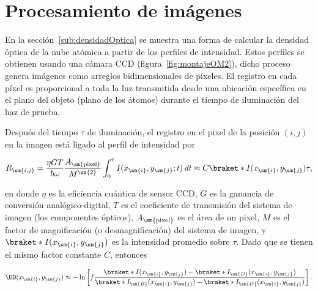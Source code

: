 \renewcommand*{\thepage}{\thechapter-\arabic{page}}
\pretocmd{\chapter}{
\clearpage
\setcounter{page}{1}
}{}{}

\makeatletter
\renewcommand*\l@section[2]{\@dottedtocline{1}{1.5em}{2.3em}{\hypersetup{linkcolor=black}#1}{#2\hskip 1.5em}}
\renewcommand{\@pnumwidth}{38.92712pt}
\makeatother

\cleardoublepage

\chapter{\label{ap:procesamientoImagenes}Procesamiento de imágenes}

En la sección~\ref{sub:densidadOptica} se muestra una forma de calcular la densidad óptica de la nube atómica a partir de los perfiles de intensidad. Estos perfiles se obtienen usando una cámara CCD (figura~\ref{fig:montajeOM2}), dicho proceso genera imágenes como arreglos bidimensionales de píxeles. El registro en cada píxel es proporcional a toda la luz transmitida desde una ubicación específica en el plano del objeto (plano de los átomos) durante el tiempo de iluminación del haz de prueba.

\p Después del tiempo $\tau$ de iluminación, el registro en el pixel de la posición $(i,j)$ en la imagen está ligado al perfil de intensidad por~\supercite{horikoshi}

\begin{equation}
\label{ec:registroPixel}
R_\sm{i,j}=\frac{\eta GT}{\hbar\omega}\frac{A_\sm{\mathrm{pixel}}}{M^\sm{2}}\int_{0}^{\tau}I(x_\sm{i},y_\sm{j};t)\:dt\approx C \braket*{I(x_\sm{i},y_\sm{j})}\tau,
\end{equation}

en donde $\eta$ es la eficiencia cuántica de sensor CCD, $G$ es la ganancia de conversión analógico-digital, $T$ es el coeficiente de transmisión del sistema de imagen (los componentes ópticos), $A_\sm{\mathrm{pixel}}$ es el área de un pixel, $M$ es el factor de magnificación (o desmagnificación) del sistema de imagen, y $\braket*{I(x_\sm{i},y_\sm{j})}$ es la intensidad promedio sobre $\tau$. Dado que se tienen el mismo factor constante $C$, entonces

\begin{equation}
\label{ec:densidadOpticaCCD}
\OD(x_\sm{i},y_\sm{j})\approx-\ln\left[f\frac{\braket*{I(x_\sm{i},y_\sm{j})}-\braket*{I_\sm{D}(x_\sm{i},y_\sm{j})}}{\braket*{I_\sm{B}(x_\sm{i},y_\sm{j})}-\braket*{I_\sm{D}(x_\sm{i},y_\sm{j})}}\right].
\end{equation}


